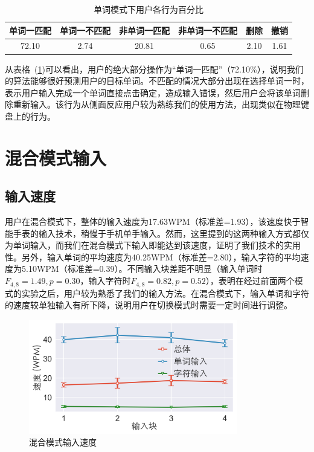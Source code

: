 \begin{table}[h]
  \centering
  \begin{minipage}[t]{0.9\linewidth} %
  \caption[单词模式下用户各行为百分比]{单词模式下用户各行为百分比}
  \label{tab:word-stat}
    \centering
    \begin{tabularx}{\linewidth}{cccccc}
      \toprule[1.5pt]
      单词一匹配 & 单词一不匹配 & 非单词一匹配 & 非单词一不匹配 & 删除 & 撤销\\\midrule[1pt]
      72.10 & 2.74 & 20.81 & 0.65 & 2.10 & 1.61\\
      \bottomrule[1.5pt]
    \end{tabularx}
  \end{minipage}
\end{table}

从表格~(\ref{tab:word-stat})可以看出，用户的绝大部分操作为“单词一匹配”（72.10\%），说明我们的算法能够很好预测用户的目标单词。不匹配的情况大部分出现在选择单词一时，表示用户输入完成一个单词直接点击确定，造成输入错误，然后用户会将该单词删除重新输入。该行为从侧面反应用户较为熟练我们的使用方法，出现类似在物理键盘上的行为。


\section{混合模式输入} 

\subsection{输入速度}
用户在混合模式下，整体的输入速度为17.63WPM（标准差=1.93），该速度快于智能手表的输入技术\cite{compass}，稍慢于手机单手输入\cite{2017blindtype}。然而，这里提到的这两种输入方式都仅为单词输入，而我们在混合模式下输入即能达到该速度，证明了我们技术的实用性。另外，输入单词的平均速度为40.25WPM（标准差=2.80），输入字符的平均速度为5.10WPM（标准差=0.39）。不同输入块差距不明显（输入单词时$F_{4,8}=1.49, p =0.30$，输入字符时$F_{4,8}=0.82, p =0.52$），表明在经过前面两个模式的实验之后，用户较为熟悉了我们的输入方法。在混合模式下，输入单词和字符的速度较单独输入有所下降，说明用户在切换模式时需要一定时间进行调整。

\begin{figure}[h] %
    \centering
    \includegraphics[height=5cm]{figures/wholespeed.png}
    \caption{混合模式输入速度}
    \label{fig:wholespeed}
\end{figure}


